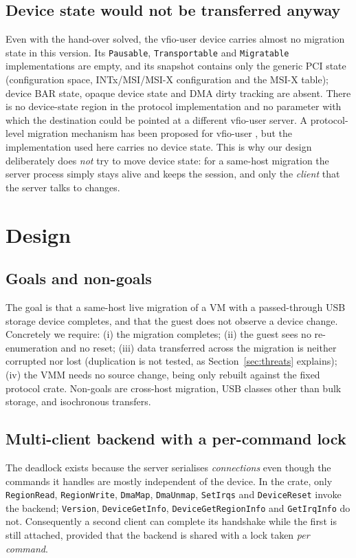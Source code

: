 \documentclass[10pt,conference]{IEEEtran}
\newcommand{\code}[1]{\texttt{#1}}
\begin{document}
\subsection{Device state would not be transferred anyway}
Even with the hand-over solved, the vfio-user device carries almost no migration state in this version. Its \code{Pausable}, \code{Transportable} and
\code{Migratable} implementations are empty, and its snapshot contains only the
generic PCI state (configuration space, INTx/MSI/MSI-X configuration and the
MSI-X table); device BAR state, opaque device state and DMA dirty tracking are
absent. There is no device-state region in the protocol implementation and no
parameter with which the destination could be pointed at a different vfio-user
server. A protocol-level migration mechanism has been proposed for vfio-user \cite{komatsu2026vfiousermig}, but the implementation used here
carries no device state. This is why our design deliberately does
\emph{not} try to move device state: for a same-host migration the server
process simply stays alive and keeps the session, and only the \emph{client}
that the server talks to changes.

\section{Design}
\label{sec:design}

\subsection{Goals and non-goals}
The goal is that a same-host live migration of a VM with a passed-through USB
storage device completes, and that the guest does not observe a device change.
Concretely we require: (i) the migration completes; (ii) the guest sees no
re-enumeration and no reset; (iii) data transferred across the migration is neither corrupted nor lost
(duplication is not tested, as Section~\ref{sec:threats} explains); (iv) the VMM needs no source change, being only rebuilt against the fixed
protocol crate. Non-goals are cross-host migration, USB classes
other than bulk storage, and isochronous transfers.

\subsection{Multi-client backend with a per-command lock}
The deadlock exists because the server serialises \emph{connections} even
though the commands it handles are mostly independent of the device. In the
crate, only \code{RegionRead}, \code{RegionWrite}, \code{DmaMap},
\code{DmaUnmap}, \code{SetIrqs} and \code{DeviceReset} invoke the backend;
\code{Version}, \code{DeviceGetInfo}, \code{DeviceGetRegionInfo} and
\code{GetIrqInfo} do not. Consequently a second client can complete its
handshake while the first is still attached, provided that the backend is
shared with a lock taken \emph{per command}.
\end{document}
